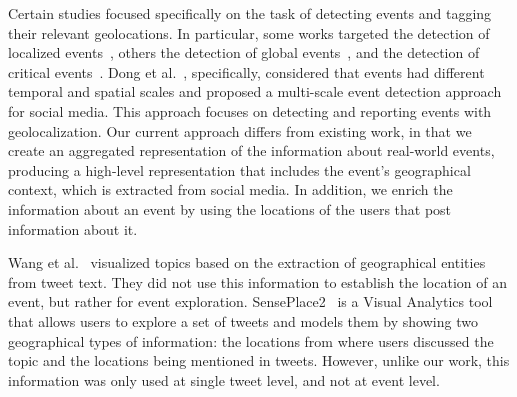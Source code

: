 Certain studies focused specifically on the task of detecting events and
tagging their relevant geolocations.  In particular, some works targeted the
detection of localized
events~\cite{Watanabe:Jasmine:2011,Abdelhaq:EvenTweet:2013,Walther:2013fb,Lee:A:2011,Krumm:2015},
others the detection of global events~\cite{sankaranarayanan:twitterstand:2009},
and the detection of critical
events~\cite{Sakaki:Tweet:2013,DeLongueville:2009}.  Dong et
al.~\cite{Dong2015}, specifically, considered that events had different
temporal and spatial scales and proposed a multi-scale event detection
approach for social media.  This approach focuses on detecting and
reporting events with geolocalization.  Our current approach differs from
existing work, in that we create an aggregated representation of
the information about real-world events, producing a high-level
representation that includes the event's geographical
context, which is extracted from social media.
In addition, we enrich the information about an event by
using the locations of the users that post information about it.
%

Wang et al.~\cite{Wang:LeadLine:2012} visualized topics based on the
extraction of geographical entities from tweet text. They did not use this information to
establish the location of an event, but rather for event exploration.
SensePlace2~\cite{MacEachren:SensePlace2:2011} is a Visual Analytics
tool that allows users to explore a set of tweets and models them by
showing two geographical types of information: the locations from
where users discussed the topic and the locations being
mentioned in tweets. However, unlike our work, this information was only used
at single tweet level, and not at event level.

